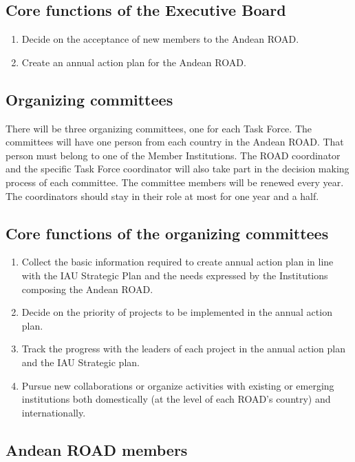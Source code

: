 \documentclass[12pt]{article}
\begin{document}
\subsection*{Core functions of the Executive Board}

\begin{enumerate}
\item Decide on the acceptance of new members to the Andean ROAD.
\item Create an annual action plan for the Andean ROAD.
\end{enumerate}


\subsection*{Organizing committees}

There will be three organizing committees, one for each Task
Force. The committees will have one person from each country in the
Andean ROAD. That person must belong to one of the Member
Institutions. The ROAD coordinator and the specific Task Force
coordinator will also take part in the decision making process of each
committee. The committee members will be renewed every year. The
coordinators should stay in their role at most for one year and a
half. 

\subsection*{Core functions of the organizing committees}
\begin{enumerate}
\item Collect the basic information required to create annual action
  plan in line with the IAU Strategic Plan and the needs expressed by
  the Institutions composing the Andean ROAD. 
\item Decide on the priority of projects to be implemented in the
  annual action plan. 
\item Track the progress with the leaders of each project in the
  annual action plan and the IAU Strategic plan. 
\item Pursue new collaborations or organize activities with existing
  or emerging institutions both domestically (at the level of each
  ROAD’s country) and internationally. 
 \end{enumerate}

\subsection*{Andean ROAD members}
\end{document}
